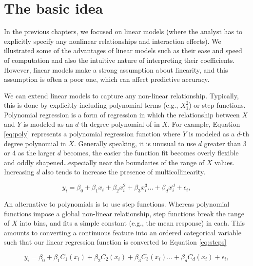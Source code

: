 \documentclass[]{krantz}
\begin{document}
\hypertarget{the-basic-idea}{%
\section{The basic idea}\label{the-basic-idea}}

In the previous chapters, we focused on linear models (where the analyst has to explicitly specify any nonlinear relationships and interaction effects). We illustrated some of the advantages of linear models such as their ease and speed of computation and also the intuitive nature of interpreting their coefficients. However, linear models make a strong assumption about linearity, and this assumption is often a poor one, which can affect predictive accuracy.

We can extend linear models to capture any non-linear relationship. Typically, this is done by explicitly including polynomial terms (e.g., \(X_1^2\)) or step functions. Polynomial regression is a form of regression in which the relationship between \(X\) and \(Y\) is modeled as an \(d\)-th degree polynomial of in \(X\). For example, Equation \eqref{eq:poly} represents a polynomial regression function where \(Y\) is modeled as a \(d\)-th degree polynomial in \(X\). Generally speaking, it is unusual to use \(d\) greater than 3 or 4 as the larger \(d\) becomes, the easier the function fit becomes overly flexible and oddly shapened\ldots{}especially near the boundaries of the range of \(X\) values. Increasing \(d\) also tends to increase the presence of multicollinearity.

\begin{equation}
\label{eq:poly}
  y_i = \beta_0 + \beta_1 x_i + \beta_2 x^2_i + \beta_3 x^3_i \dots + \beta_d x^d_i + \epsilon_i,
\end{equation}

An alternative to polynomials is to use step functions. Whereas polynomial functions impose a global non-linear relationship, step functions break the range of \(X\) into bins, and fits a simple constant (e.g., the mean response) in each. This amounts to converting a continuous feature into an ordered categorical variable such that our linear regression function is converted to Equation \eqref{eq:steps}

\begin{equation}
\label{eq:steps}
  y_i = \beta_0 + \beta_1 C_1(x_i) + \beta_2 C_2(x_i) + \beta_3 C_3(x_i) \dots + \beta_d C_d(x_i) + \epsilon_i,
\end{equation}
\end{document}
